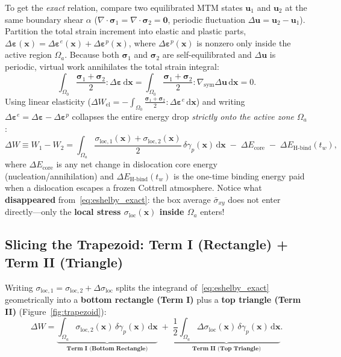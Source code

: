 \documentclass[11pt,a4paper]{article}
\newcommand{\dW}{\Delta W}
\newcommand{\sigbar}{\bar{\sigma}_{xy}}
\newcommand{\sigloc}{\sigma_{\mathrm{loc}}}
\newcommand{\dsigloc}{\Delta\sigma_{\mathrm{loc}}}
\newcommand{\dgamp}{\delta\gamma_p}
\begin{document}
To get the \emph{exact} relation, compare two equilibrated MTM states $\mathbf{u}_1$ and $\mathbf{u}_2$ at the same boundary shear $\alpha$ ($\nabla\cdot\boldsymbol{\sigma}_1 = \nabla\cdot\boldsymbol{\sigma}_2 = \mathbf{0}$, periodic fluctuation $\Delta\mathbf{u} = \mathbf{u}_2 - \mathbf{u}_1$). Partition the total strain increment into elastic and plastic parts, $\Delta\boldsymbol{\varepsilon}(\mathbf{x}) = \Delta\boldsymbol{\varepsilon}^e(\mathbf{x}) + \Delta\boldsymbol{\varepsilon}^p(\mathbf{x})$, where $\Delta\boldsymbol{\varepsilon}^p(\mathbf{x})$ is nonzero only inside the active region $\Omega_a$. Because both $\boldsymbol{\sigma}_1$ and $\boldsymbol{\sigma}_2$ are self-equilibrated and $\Delta\mathbf{u}$ is periodic, virtual work annihilates the total strain integral:
\[
\int_{\Omega_0} \frac{\boldsymbol{\sigma}_1 + \boldsymbol{\sigma}_2}{2} : \Delta\boldsymbol{\varepsilon}\,\mathrm{d}\mathbf{x}
= \int_{\Omega_0} \frac{\boldsymbol{\sigma}_1 + \boldsymbol{\sigma}_2}{2} : \nabla_{\mathrm{sym}}\Delta\mathbf{u}\,\mathrm{d}\mathbf{x} = 0.
\]
Using linear elasticity ($\Delta W_{\mathrm{el}} = -\int_{\Omega_0}\frac{\boldsymbol{\sigma}_1+\boldsymbol{\sigma}_2}{2}:\Delta\boldsymbol{\varepsilon}^e\,\mathrm{d}\mathbf{x}$) and writing $\Delta\boldsymbol{\varepsilon}^e = \Delta\boldsymbol{\varepsilon} - \Delta\boldsymbol{\varepsilon}^p$ collapses the entire energy drop \emph{strictly onto the active zone $\Omega_a$}:
\begin{equation}
\label{eq:eshelby_exact}
\dW \equiv W_1 - W_2
= \int_{\Omega_a} \frac{\sigma_{\mathrm{loc},1}(\mathbf{x}) + \sigma_{\mathrm{loc},2}(\mathbf{x})}{2}\,\dgamp(\mathbf{x})\,\mathrm{d}\mathbf{x}
\;-\; \Delta E_{\mathrm{core}} \;-\; \Delta E_{\mathrm{H\text{-}bind}}(t_w),
\end{equation}
where $\Delta E_{\mathrm{core}}$ is any net change in dislocation core energy (nucleation/annihilation) and $\Delta E_{\mathrm{H\text{-}bind}}(t_w)$ is the one-time binding energy paid when a dislocation escapes a frozen Cottrell atmosphere. Notice what \textbf{disappeared} from~\eqref{eq:eshelby_exact}: the box average $\sigbar$ does not enter directly---only the \textbf{local stress $\sigloc(\mathbf{x})$ inside $\Omega_a$} enters!

\subsection{Slicing the Trapezoid: Term I (Rectangle) + Term II (Triangle)}

Writing $\sigma_{\mathrm{loc},1} = \sigma_{\mathrm{loc},2} + \dsigloc$ splits the integrand of~\eqref{eq:eshelby_exact} geometrically into a \textbf{bottom rectangle (Term I)} plus a \textbf{top triangle (Term II)} (Figure~\ref{fig:trapezoid}):
\begin{equation}
\label{eq:term1_term2}
\dW = \underbrace{\int_{\Omega_a} \sigma_{\mathrm{loc},2}(\mathbf{x})\,\dgamp(\mathbf{x})\,\mathrm{d}\mathbf{x}}_{\textbf{Term I (Bottom Rectangle)}}
\;+\; \underbrace{\frac{1}{2}\int_{\Omega_a} \dsigloc(\mathbf{x})\,\dgamp(\mathbf{x})\,\mathrm{d}\mathbf{x}}_{\textbf{Term II (Top Triangle)}}.
\end{equation}
\end{document}
